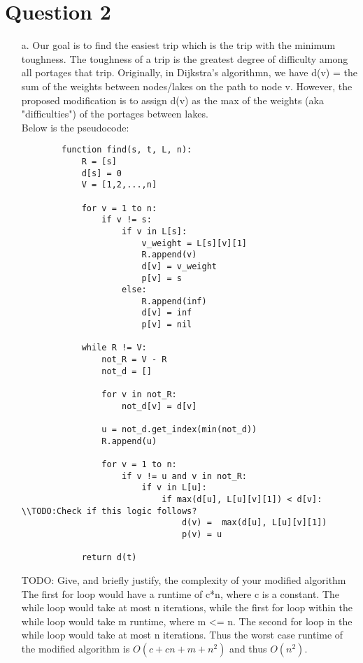 \documentclass[12pt]{article}
\begin{document}
\section*{Question 2}
\begin{enumerate}
    \item[a.] Our goal is to find the easiest trip which is the trip with the minimum toughness. The toughness 
    of a trip is the greatest degree of difficulty among all portages that trip. Originally, in Dijkstra’s 
    algorithmn, we have d(v) = the sum of the weights between nodes/lakes on the path to node v. However, 
    the proposed modification is to assign d(v) as the max of the weights (aka "difficulties") of the portages 
    between lakes. \\

    Below is the pseudocode:

    \begin{verbatim}
        function find(s, t, L, n):
            R = [s]
            d[s] = 0
            V = [1,2,...,n]

            for v = 1 to n:
                if v != s:
                    if v in L[s]:
                        v_weight = L[s][v][1]
                        R.append(v)
                        d[v] = v_weight
                        p[v] = s
                    else:
                        R.append(inf)
                        d[v] = inf
                        p[v] = nil
            
            while R != V:
                not_R = V - R
                not_d = []

                for v in not_R:
                    not_d[v] = d[v]
        
                u = not_d.get_index(min(not_d))
                R.append(u)

                for v = 1 to n:
                    if v != u and v in not_R:
                        if v in L[u]:
                            if max(d[u], L[u][v][1]) < d[v]: \\TODO:Check if this logic follows?
                                d(v) =  max(d[u], L[u][v][1])
                                p(v) = u

            return d(t)
    \end{verbatim}
    TODO:   Give, and briefly justify, the complexity of your modified algorithm
    The first for loop would have a runtime of c*n, where c is a constant. The while loop would take at most
    n iterations, while the first for loop within the while loop would take m runtime, where m <= n. The second
    for loop in the while loop would take at most n iterations. Thus the worst case runtime of the modified
    algorithm is $O(c + cn + m + n^2)$ and thus $O(n^2)$.


\end{enumerate}
\end{document}
